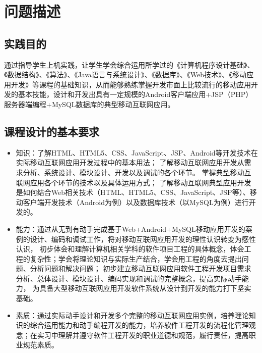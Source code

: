 \documentclass[UTF8,12pt]{article}
\newcommand\myemptypage{
    \null
    \thispagestyle{empty}
    \addtocounter{page}{-1}
    \newpage
}
\begin{document}
\begin{titlepage}
    
\end{titlepage}

\myemptypage

\begin{center}
    \tableofcontents
\end{center}

\newpage

\section{问题描述}
\subsection{实践目的}
通过指导学生上机实践，让学生学会综合运用所学过的《计算机程序设计基础》、《数据结构》、《算法》、《Java语言与系统设计》、《数据库》、《Web技术》、《移动应用开发》等课程的基础知识，从而能够熟练掌握开发市面上比较流行的移动应用开发的基本技能，设计和开发出具有一定规模的Android客户端应用+JSP（PHP）服务器端编程+MySQL数据库的典型移动互联网应用。

\subsection{课程设计的基本要求}
\begin{itemize}
    \item 知识：了解HTML、HTML5、CSS、JavaScript、JSP、Android等开发技术在实际移动互联网应用开发过程中的基本用法；
    了解移动互联网应用开发从需求分析、系统设计、模块设计、开发以及调试的各个环节。
    掌握典型移动互联网应用各个环节的技术以及具体运用方式；
    了解移动互联网典型应用开发是如何结合Web相关技术（HTML、HTML5、CSS、JavaScript、JSP等）、移动客户端开发技术（Android为例）以及数据库技术（以MySQL为例）进行开发的。
    \item 能力：通过从无到有动手完成基于Web+Android+MySQL移动应用开发的案例的设计、编码和调试工作，将对移动互联网应用开发的理性认识转变为感性认识，
    初步体会和理解计算机相关学科的软件项目工程的具体概念，体会工程的复杂性；学会将理论知识与实际生产结合，学会用工程的角度去提出问题、分析问题和解决问题；
    初步建立移动互联网应用软件工程开发项目需求分析、总体设计、模块设计、编码实现和调试的完整概念，提高实际动手能力，
    为具备大型移动互联网应用开发软件系统从设计到开发的能力打下坚实基础。
    \item 素质：通过实际动手设计和开发多个完整的移动互联网应用实例，培养理论知识的综合运用能力和动手编程开发的能力，培养软件工程开发的流程化管理观念；在实习中理解并遵守软件工程开发的职业道德和规范，履行责任，提高职业规范素质。
\end{itemize}
\end{document}
